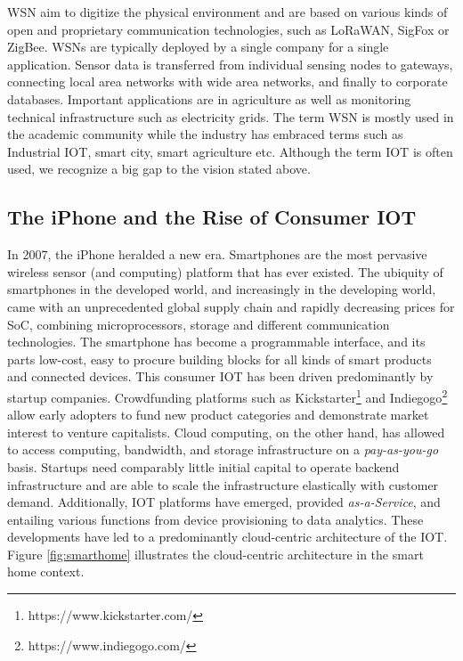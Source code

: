 \ac{WSN} aim to digitize the physical environment and are based on various kinds of open and proprietary communication technologies, such as LoRaWAN, SigFox or ZigBee. \ac{WSN}s are typically deployed by a single company for a single application. Sensor data is transferred from individual sensing nodes to gateways, connecting local area networks with wide area networks, and finally to corporate databases. Important applications are in agriculture as well as monitoring technical infrastructure such as electricity grids. The term \ac{WSN} is mostly used in the academic community while the industry has embraced terms such as Industrial \ac{IOT}, smart city, smart agriculture etc. Although the term \ac{IOT} is often used, we recognize a big gap to the vision stated above.

\subsection{The iPhone and the Rise of Consumer IOT}

In 2007, the iPhone heralded a new era. Smartphones are the most pervasive wireless sensor (and computing) platform that has ever existed. The ubiquity of smartphones in the developed world, and increasingly in the developing world, came with an unprecedented global supply chain and rapidly decreasing prices for \ac{SoC}, combining microprocessors, storage and different communication technologies. The smartphone has become a programmable interface, and its parts low-cost, easy to procure building blocks for all kinds of smart products and connected devices. This consumer \ac{IOT} has been driven predominantly by startup companies. Crowdfunding platforms such as Kickstarter\footnote{https://www.kickstarter.com/} and Indiegogo\footnote{https://www.indiegogo.com/} allow early adopters to fund new product categories and demonstrate market interest to venture capitalists. Cloud computing, on the other hand, has allowed to access computing, bandwidth, and storage infrastructure on a \emph{pay-as-you-go} basis. Startups need comparably little initial capital to operate backend infrastructure and are able to scale the infrastructure elastically with customer demand. Additionally, \ac{IOT} platforms have emerged, provided \emph{as-a-Service}, and entailing various functions from device provisioning to data analytics. These developments have led to a predominantly cloud-centric architecture of the \ac{IOT}. Figure \ref{fig:smarthome} illustrates the cloud-centric architecture in the smart home context.


